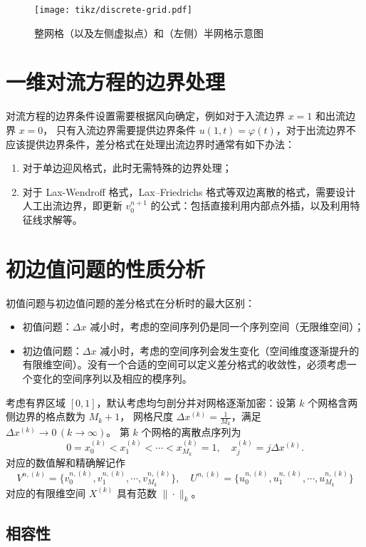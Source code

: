 \begin{figure}[htbp]
    \centering
    \texttt{[image: tikz/discrete-grid.pdf]}
    \caption{整网格（以及左侧虚拟点）和（左侧）半网格示意图} \label{fig:discrete-grid}
\end{figure}

\section{一维对流方程的边界处理}

对流方程的边界条件设置需要根据风向确定，例如对于入流边界 $x=1$ 和出流边界 $x=0$，
只有入流边界需要提供边界条件 $u(1,t) = \varphi(t)$，对于出流边界不应该提供边界条件，差分格式在处理出流边界时通常有如下办法：
\begin{enumerate}
    \item 对于单边迎风格式，此时无需特殊的边界处理；
    \item 对于 Lax-Wendroff 格式，Lax–Friedrichs 格式等双边离散的格式，需要设计人工出流边界，即更新 $v_0^{n+1}$ 的公式：包括直接利用内部点外插，以及利用特征线求解等。
\end{enumerate}


\section{初边值问题的性质分析}

初值问题与初边值问题的差分格式在分析时的最大区别：
\begin{itemize}
    \item 初值问题：$\Delta x$ 减小时，考虑的空间序列仍是同一个序列空间（无限维空间）；
    \item 初边值问题：$\Delta x$ 减小时，考虑的空间序列会发生变化（空间维度逐渐提升的有限维空间）。没有一个合适的空间可以定义差分格式的收敛性，必须考虑一个变化的空间序列以及相应的模序列。
\end{itemize}


考虑有界区域 $[0,1]$，默认考虑均匀剖分并对网格逐渐加密：设第 $k$ 个网格含两侧边界的格点数为 $M_k+1$，
网格尺度 $\Delta x^{(k)} = \frac{1}{M_k}$，满足 $\Delta x^{(k)} \to 0\,(k \to \infty)$。
第 $k$ 个网格的离散点序列为
\[
    0 = x_0^{(k)} < x_1^{(k)} < \cdots < x_{M_k}^{(k)} = 1, \quad x_j^{(k)} = j \Delta x^{(k)}.
\]
对应的数值解和精确解记作
\[
    V^{n,(k)} = \{v_0^{n,(k)},v_1^{n,(k)},\cdots,v_{M_k}^{n,(k)}\}, \quad
    U^{n,(k)} = \{u_0^{n,(k)},u_1^{n,(k)},\cdots,u_{M_k}^{n,(k)}\}
\]
对应的有限维空间 $X^{(k)}$ 具有范数 $\|\cdot\|_k$。

\subsection{相容性}


